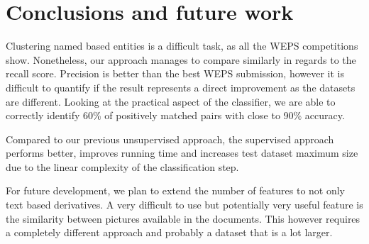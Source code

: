 \chapter{Conclusions and future work}
\label{chapter:conclusions}

Clustering named  based entities is a difficult task, as all the WEPS competitions show.
Nonetheless, our approach manages to compare similarly in regards to the recall score.
Precision is better than the best WEPS submission, however it is difficult to quantify
if the result represents a direct improvement as the datasets are different.
Looking at the practical aspect of the classifier, we are able to correctly
identify 60\% of positively matched pairs with close to 90\% accuracy.

Compared to our previous unsupervised approach, the supervised approach performs
better, improves running time and increases test dataset maximum size due to the
linear complexity of the classification step.

For future development, we plan to extend the number of features to not only
text based derivatives. A very difficult to use but potentially very useful feature
is the similarity between pictures available in the documents. This however requires
a completely different approach and probably a dataset that is a lot larger.
